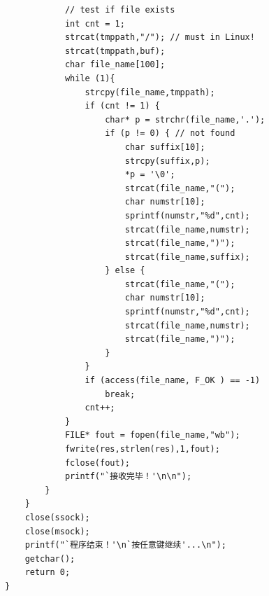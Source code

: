 \documentclass[logo,reportComp]{thesis}
\begin{document}
\begin{lstlisting}
            // test if file exists
            int cnt = 1;
            strcat(tmppath,"/"); // must in Linux!
            strcat(tmppath,buf);
            char file_name[100];
            while (1){
                strcpy(file_name,tmppath);
                if (cnt != 1) {
                    char* p = strchr(file_name,'.');
                    if (p != 0) { // not found
                        char suffix[10];
                        strcpy(suffix,p);
                        *p = '\0';
                        strcat(file_name,"(");
                        char numstr[10];
                        sprintf(numstr,"%d",cnt);
                        strcat(file_name,numstr);
                        strcat(file_name,")");
                        strcat(file_name,suffix);
                    } else {
                        strcat(file_name,"(");
                        char numstr[10];
                        sprintf(numstr,"%d",cnt);
                        strcat(file_name,numstr);
                        strcat(file_name,")");
                    }
                }
                if (access(file_name, F_OK ) == -1)
                    break;
                cnt++;
            }
            FILE* fout = fopen(file_name,"wb");
            fwrite(res,strlen(res),1,fout);
            fclose(fout);
            printf("`接收完毕！'\n\n");
        }
    }
    close(ssock);
    close(msock);
    printf("`程序结束！'\n`按任意键继续'...\n");
    getchar();
    return 0;
}
\end{lstlisting}
\end{document}
